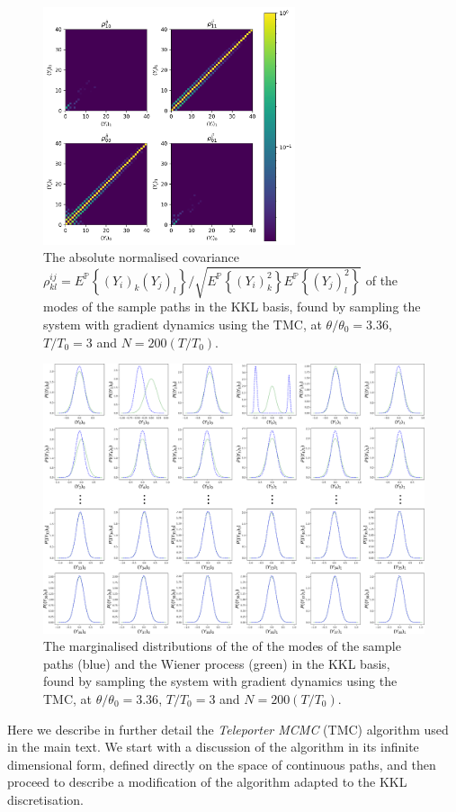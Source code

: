 \begin{figure}[t]
\includegraphics[width=0.66\textwidth]{figs_part1/mcmc/mode_convergence_covariance}
\centering \caption{The absolute normalised covariance $\rho_{kl}^{ij}=E^{\mathbb{P}}\left\{ (Y_{i})_{k}(Y_{j})_{l}\right\} /\sqrt{E^{\mathbb{P}}\left\{ (Y_{i})_{k}^{2}\right\} E^{\mathbb{P}}\left\{ (Y_{j})_{l}^{2}\right\} }$
of the modes of the sample paths in the KKL basis, found by sampling
the system with gradient dynamics using the TMC, at $\theta/\theta_{0}=3.36$,
$T/T_{0}=3$ and $N=200(T/T_{0})$.}
\label{fig:mode covariance} 
\end{figure}
\begin{figure}[t]
\includegraphics[width=1\textwidth]{figs_part1/mcmc/mode_convergence_marginalised}
\centering \caption{The marginalised distributions of the of the modes of the sample paths
(blue) and the Wiener process (green) in the KKL basis, found by sampling
the system with gradient dynamics using the TMC, at $\theta/\theta_{0}=3.36$,
$T/T_{0}=3$ and $N=200(T/T_{0})$.}
\label{fig:mode marginalised} 
\end{figure}
Here we describe in further detail the \emph{Teleporter MCMC }(TMC)
algorithm used in the main text. We start with a discussion of the
algorithm in its infinite dimensional form, defined directly on the
space of continuous paths, and then proceed to describe a modification
of the algorithm adapted to the KKL discretisation.

